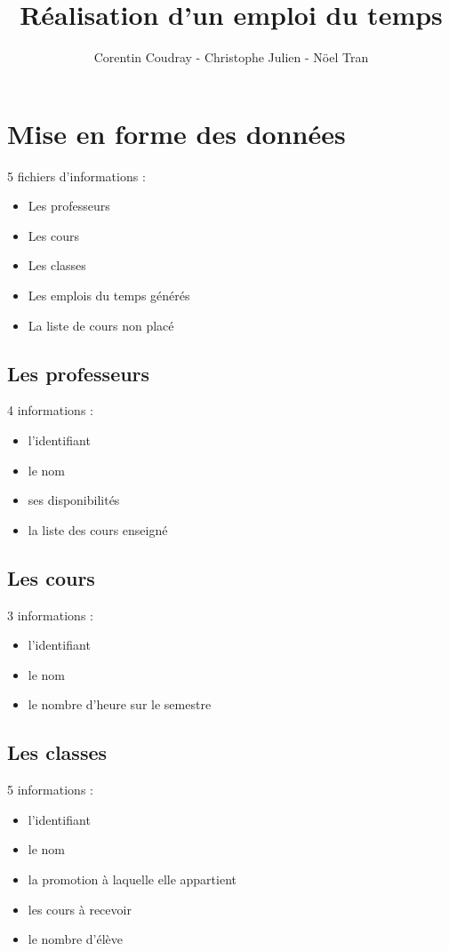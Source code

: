 \documentclass{beamer}
\title{Réalisation d'un emploi du temps}
\author{Corentin Coudray - Christophe Julien - Nöel Tran}
\institute{ESME SUDRIA}
\begin{document}
\begin{frame}
\titlepage
\end{frame}

\section{Mise en forme des données}
\begin{frame}
5 fichiers d'informations : 
\begin{itemize}
\item Les professeurs
\item Les cours
\item Les classes
\item Les emplois du temps générés
\item La liste de cours non placé
\end{itemize}
\end{frame}

\subsection{Les professeurs}
\begin{frame}
4 informations : 
\begin{itemize}
\item l'identifiant
\item le nom
\item ses disponibilités
\item la liste des cours enseigné
\end{itemize}
\end{frame}

\subsection{Les cours}
\begin{frame}
3 informations : 
\begin{itemize}
\item l'identifiant
\item le nom
\item le nombre d'heure sur le semestre
\end{itemize}
\end{frame}

\subsection{Les classes}
\begin{frame}
5 informations : 
\begin{itemize}
\item l'identifiant
\item le nom
\item la promotion à laquelle elle appartient
\item les cours à recevoir
\item le nombre d'élève
\end{itemize}
\end{frame}
\end{document}
